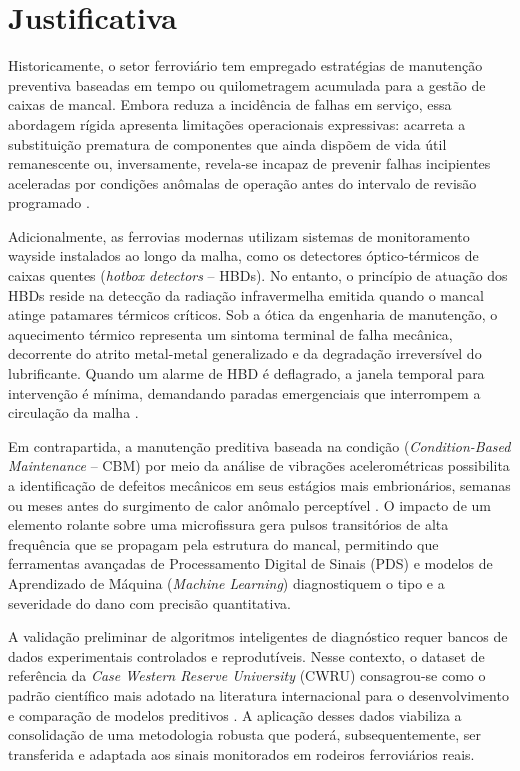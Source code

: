 \section{Justificativa}
\label{sec:justificativa}

Historicamente, o setor ferroviário tem empregado estratégias de manutenção preventiva baseadas em tempo ou quilometragem acumulada para a gestão de caixas de mancal. Embora reduza a incidência de falhas em serviço, essa abordagem rígida apresenta limitações operacionais expressivas: acarreta a substituição prematura de componentes que ainda dispõem de vida útil remanescente ou, inversamente, revela-se incapaz de prevenir falhas incipientes aceleradas por condições anômalas de operação antes do intervalo de revisão programado \cite{mobley2002vibration}.

Adicionalmente, as ferrovias modernas utilizam sistemas de monitoramento wayside instalados ao longo da malha, como os detectores óptico-térmicos de caixas quentes (\textit{hotbox detectors} -- HBDs). No entanto, o princípio de atuação dos HBDs reside na detecção da radiação infravermelha emitida quando o mancal atinge patamares térmicos críticos. Sob a ótica da engenharia de manutenção, o aquecimento térmico representa um sintoma terminal de falha mecânica, decorrente do atrito metal-metal generalizado e da degradação irreversível do lubrificante. Quando um alarme de HBD é deflagrado, a janela temporal para intervenção é mínima, demandando paradas emergenciais que interrompem a circulação da malha \cite{smith2015rolling}.

Em contrapartida, a manutenção preditiva baseada na condição (\textit{Condition-Based Maintenance} -- CBM) por meio da análise de vibrações acelerométricas possibilita a identificação de defeitos mecânicos em seus estágios mais embrionários, semanas ou meses antes do surgimento de calor anômalo perceptível \cite{randall2011rolling}. O impacto de um elemento rolante sobre uma microfissura gera pulsos transitórios de alta frequência que se propagam pela estrutura do mancal, permitindo que ferramentas avançadas de Processamento Digital de Sinais (PDS) e modelos de Aprendizado de Máquina (\textit{Machine Learning}) diagnostiquem o tipo e a severidade do dano com precisão quantitativa.

A validação preliminar de algoritmos inteligentes de diagnóstico requer bancos de dados experimentais controlados e reprodutíveis. Nesse contexto, o dataset de referência da \textit{Case Western Reserve University} (CWRU) consagrou-se como o padrão científico mais adotado na literatura internacional para o desenvolvimento e comparação de modelos preditivos \cite{smith2015rolling}. A aplicação desses dados viabiliza a consolidação de uma metodologia robusta que poderá, subsequentemente, ser transferida e adaptada aos sinais monitorados em rodeiros ferroviários reais.

